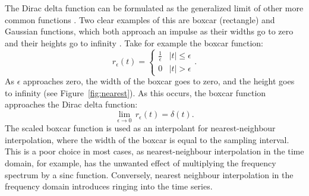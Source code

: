 The Dirac delta function can be formulated as the generalized limit of other more common functions \citep{papoulis62}.
Two clear examples of this are boxcar (rectangle) and Gaussian functions, which both approach an impulse as their widths go to zero and their heights go to infinity \citep{papoulis62}.
Take for example the boxcar function:
\begin{equation}
	\label{eq:boxcar}
	r_{\epsilon} \left( t \right) = \left\{ \begin{array}{cc} \frac{1}{\epsilon} & |t| \leq \epsilon  \\
 0 & |t| > \epsilon 
	\end{array}
	\right..
\end{equation} 
As $\epsilon$ approaches zero, the width of the boxcar goes to zero, and the height goes to infinity (see Figure~\ref{fig:nearest}).
As this occurs, the boxcar function approaches the Dirac delta function:
\begin{equation}
	\label{eq:delta_boxcar}
	\lim_{\epsilon \to 0} \, r_{\epsilon} \left( t \right) = \delta \left( t \right).
\end{equation} 
The scaled boxcar function is used as an interpolant for nearest-neighbour interpolation, where the width of the boxcar is equal to the sampling interval.
This is a poor choice in most cases, as nearest-neighbour interpolation in the time domain, for example, has the unwanted effect of multiplying the frequency spectrum by a sinc function.
Conversely, nearest neighbour interpolation in the frequency domain introduces ringing into the time series.   

